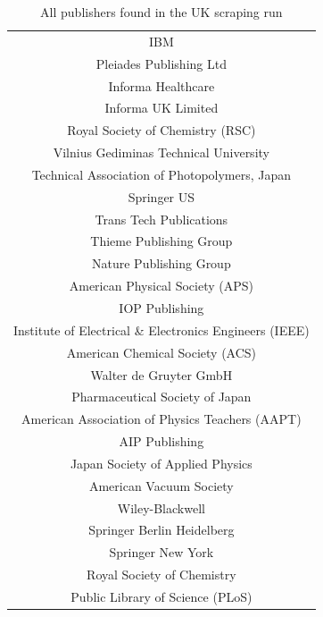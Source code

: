 \begin{table}[H]
\centering
\caption{All publishers found in the UK scraping run}
\label{tab:uk_publishers_table}
\begin{tabular}{||c||}
\hline 
IBM                                               \\
Pleiades Publishing Ltd                           \\
Informa Healthcare                                \\
Informa UK Limited                                \\
Royal Society of Chemistry (RSC)                  \\
Vilnius Gediminas Technical University            \\
Technical Association of Photopolymers, Japan     \\
Springer US                                       \\
Trans Tech Publications                           \\
Thieme Publishing Group                           \\
Nature Publishing Group                           \\
American Physical Society (APS)                   \\
IOP Publishing                                    \\
Institute of Electrical \& Electronics Engineers (IEEE)\\
American Chemical Society (ACS)                   \\
Walter de Gruyter GmbH                            \\
Pharmaceutical Society of Japan                   \\
American Association of Physics Teachers (AAPT)   \\
AIP Publishing                                    \\
Japan Society of Applied Physics                  \\
American Vacuum Society                           \\
Wiley-Blackwell                                   \\
Springer Berlin Heidelberg                        \\
Springer New York                                 \\
Royal Society of Chemistry                        \\
Public Library of Science (PLoS)                  \\

\end{tabular}
\end{table}
